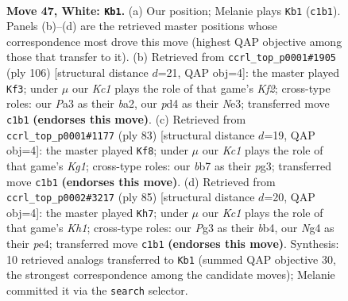 \documentclass[11pt]{article}
\begin{document}
\clearpage

\begin{figure}[p]\centering
\begin{subfigure}{0.46\textwidth}\centering
\resizebox{\linewidth}{!}{%
\newchessgame
\chessboard[
  setfen={5k2/1b1n4/8/8/p2p2N1/P5P1/1PP5/2K5 w - - 12 47},
  showmover=false,
  pgfstyle=straightmove, color=movearrow, markmove={c1-b1}
]}
\caption{}
\end{subfigure}\hfill
\begin{subfigure}{0.46\textwidth}\centering
\resizebox{\linewidth}{!}{%
\newchessgame
\chessboard[
  setfen={3k4/6p1/N1n2p2/5P2/7p/4N3/b4KPP/8 w - - 0 54},
  showmover=false,
  pgfstyle=straightmove, color=movearrow, markmove={f2-f3}
]}
\caption{}
\end{subfigure}
\\[4pt]
\begin{subfigure}{0.46\textwidth}\centering
\resizebox{\linewidth}{!}{%
\newchessgame
\chessboard[
  setfen={6k1/np3pp1/7p/4P3/1N3P2/3K2PP/8/8 b - - 3 42},
  showmover=false,
  pgfstyle=straightmove, color=movearrow, markmove={g8-f8}
]}
\caption{}
\end{subfigure}\hfill
\begin{subfigure}{0.46\textwidth}\centering
\resizebox{\linewidth}{!}{%
\newchessgame
\chessboard[
  setfen={7k/6p1/5p1p/8/1Bb1PNPP/1n6/5K2/8 b - - 0 43},
  showmover=false,
  pgfstyle=straightmove, color=movearrow, markmove={h8-h7}
]}
\caption{}
\end{subfigure}
\caption{\textbf{Move 47, White: \texttt{Kb1}.} (a) Our position; Melanie plays \texttt{Kb1} (\texttt{c1b1}). Panels (b)--(d) are the retrieved master positions whose correspondence most drove this move (highest QAP objective among those that transfer to it). (b) Retrieved from \texttt{ccrl\_top\_p0001\#1905} (ply 106) [structural distance $d$=21, QAP obj=4]: the master played \texttt{Kf3}; under $\mu$ our \emph{Kc1} plays the role of that game's \emph{Kf2}; cross-type roles: our \emph{P}a3 as their \emph{b}a2, our \emph{p}d4 as their \emph{N}e3; transferred move \texttt{c1b1} \textbf{(endorses this move)}. (c) Retrieved from \texttt{ccrl\_top\_p0001\#1177} (ply 83) [structural distance $d$=19, QAP obj=4]: the master played \texttt{Kf8}; under $\mu$ our \emph{Kc1} plays the role of that game's \emph{Kg1}; cross-type roles: our \emph{b}b7 as their \emph{p}g3; transferred move \texttt{c1b1} \textbf{(endorses this move)}. (d) Retrieved from \texttt{ccrl\_top\_p0002\#3217} (ply 85) [structural distance $d$=20, QAP obj=4]: the master played \texttt{Kh7}; under $\mu$ our \emph{Kc1} plays the role of that game's \emph{Kh1}; cross-type roles: our \emph{P}g3 as their \emph{b}b4, our \emph{N}g4 as their \emph{p}e4; transferred move \texttt{c1b1} \textbf{(endorses this move)}. Synthesis: 10 retrieved analogs transferred to \texttt{Kb1} (summed QAP objective 30, the strongest correspondence among the candidate moves); Melanie committed it via the \texttt{search} selector.}
\label{fig:thought-m92}
\end{figure}
\end{document}
